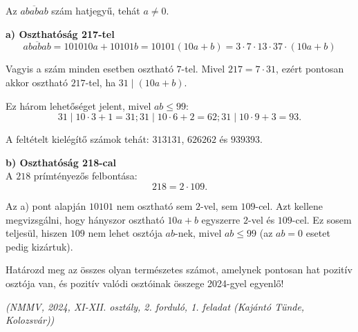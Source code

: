 \begin{solution}
Az $\overline{ababab}$ szám hatjegyű, tehát $a\ne0$.

\textbf{a) Oszthatóság 217-tel}\\

\[
\overline{ababab}=101010a+10101b=10101(10a+b)=3\cdot7\cdot13\cdot37\cdot(10a+b)
\]

Vagyis a szám minden esetben osztható $7$-tel. Mivel $217=7\cdot31$,
ezért pontosan akkor osztható $217$-tel, ha $31\mid(10a+b)$.

Ez három lehetőséget jelent, mivel $ab\leq99$: 
\[
31\mid10\cdot3+1=31;31\mid10\cdot6+2=62;31\mid10\cdot9+3=93.
\]

A feltételt kielégítő számok tehát: $313131$, $626262$ és $939393$.

\textbf{b) Oszthatóság 218-cal}\\

A $218$ prímtényezős felbontása: 
\[
218=2\cdot109.
\]

Az a) pont alapján $10101$ nem osztható sem $2$-vel, sem $109$-cel.
Azt kellene megvizsgálni, hogy hányszor osztható $10a+b$ egyszerre
$2$-vel és $109$-cel. Ez sosem teljesül, hiszen $109$ nem lehet
osztója $ab$-nek, mivel $ab\leq99$ (az $ab=0$ esetet pedig kizártuk). 
\end{solution}
\begin{extraproblem}
Határozd meg az összes olyan természetes számot, amelynek pontosan
hat pozitív osztója van, és pozitív valódi osztóinak összege 2024-gyel
egyenlő!
\begin{flushright}
\textit{(NMMV, 2024, XI-XII. osztály, 2. forduló, 1. feladat (Kajántó
Tünde, Kolozsvár))} 
\par\end{flushright}
\end{extraproblem}


